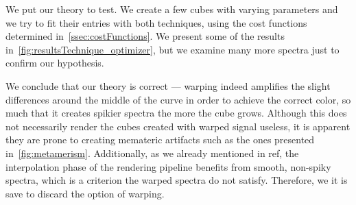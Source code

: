 We put our theory to test. We create a few cubes with varying parameters and we try to fit their entries with both techniques, using the cost functions determined in~\cref{ssec:costFunctions}. We present some of the results in~\cref{fig:resultsTechnique_optimizer}, but we examine many more spectra just to confirm our hypothesis. 

We conclude that our theory is correct --- warping indeed amplifies the slight differences around the middle of the curve in order to achieve the correct color, so much that it creates spikier spectra the more the cube grows. Although this does not necessarily render the cubes created with warped signal useless, it is apparent they are prone to creating memateric artifacts such as the ones presented in~\cref{fig:metamerism}. Additionally, as we already mentioned in ref, the interpolation phase of the rendering pipeline benefits from smooth, non-spiky spectra, which is a criterion the warped spectra do not satisfy. Therefore, we it is save to discard the option of warping.

